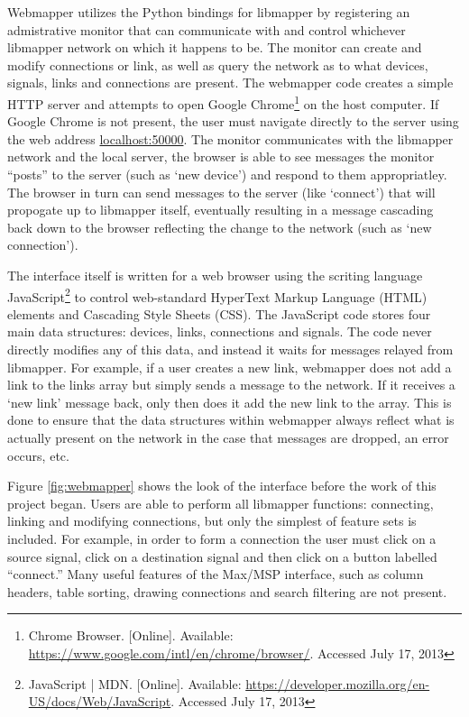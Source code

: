 Webmapper utilizes the Python bindings for libmapper by registering an admistrative monitor that can communicate with and control whichever libmapper network on which it happens to be. The monitor can create and modify connections or link, as well as query the network as to what devices, signals, links and connections are present. The webmapper code creates a simple HTTP server and attempts to open Google Chrome\footnote{Chrome Browser. [Online]. Available: \url{https://www.google.com/intl/en/chrome/browser/}. Accessed July 17, 2013} on the host computer. If Google Chrome is not present, the user must navigate directly to the server using the web address \url{localhost:50000}. The monitor communicates with the libmapper network and the local server, the browser is able to see messages the monitor ``posts'' to the server (such as `new device') and respond to them appropriatley. The browser in turn can send messages to the server (like `connect') that will propogate up to libmapper itself, eventually resulting in a message cascading back down to the browser reflecting the change to the network (such as `new connection'). 

The interface itself is written for a web browser using the scriting language JavaScript\footnote{JavaScript | MDN. [Online]. Available: \url{https://developer.mozilla.org/en-US/docs/Web/JavaScript}. Accessed July 17, 2013} to control web-standard HyperText Markup Language (HTML) elements and Cascading Style Sheets (CSS). The JavaScript code stores four main data structures: devices, links, connections and signals. The code never directly modifies any of this data, and instead it waits for messages relayed from libmapper. For example, if a user creates a new link, webmapper does not add a link to the links array but simply sends a message to the network. If it receives a `new link' message back, only then does it add the new link to the array. This is done to ensure that the data structures within webmapper always reflect what is actually present on the network in the case that messages are dropped, an error occurs, etc.

Figure \ref{fig:webmapper} shows the look of the interface before the work of this project began. Users are able to perform all libmapper functions: connecting, linking and modifying connections, but only the simplest of feature sets is included. For example, in order to form a connection the user must click on a source signal, click on a destination signal and then click on a button labelled ``connect.'' Many useful features of the Max/MSP interface, such as column headers, table sorting, drawing connections and search filtering are not present.

